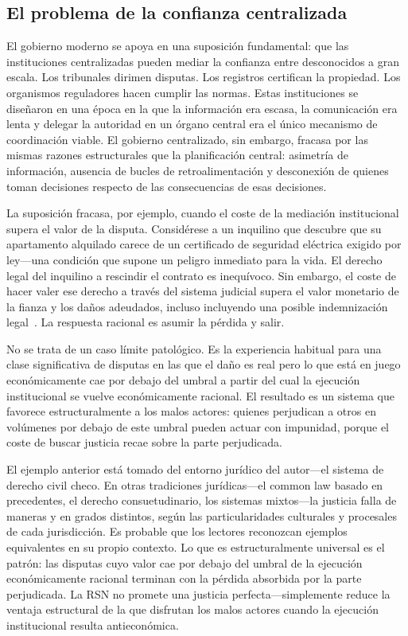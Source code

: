 \documentclass[11pt,a4paper,twocolumn]{article}
\begin{document}
\subsection{El problema de la confianza centralizada}

El gobierno moderno se apoya en una suposición fundamental: que las instituciones centralizadas pueden mediar la confianza entre desconocidos a gran escala. Los tribunales dirimen disputas. Los registros certifican la propiedad. Los organismos reguladores hacen cumplir las normas. Estas instituciones se diseñaron en una época en la que la información era escasa, la comunicación era lenta y delegar la autoridad en un órgano central era el único mecanismo de coordinación viable. El gobierno centralizado, sin embargo, fracasa por las mismas razones estructurales que la planificación central: asimetría de información, ausencia de bucles de retroalimentación y desconexión de quienes toman decisiones respecto de las consecuencias de esas decisiones.

La suposición fracasa, por ejemplo, cuando el coste de la mediación institucional supera el valor de la disputa. Considérese a un inquilino que descubre que su apartamento alquilado carece de un certificado de seguridad eléctrica exigido por ley---una condición que supone un peligro inmediato para la vida. El derecho legal del inquilino a rescindir el contrato es inequívoco. Sin embargo, el coste de hacer valer ese derecho a través del sistema judicial supera el valor monetario de la fianza y los daños adeudados, incluso incluyendo una posible indemnización legal~\cite{czcourtfees}. La respuesta racional es asumir la pérdida y salir.

No se trata de un caso límite patológico. Es la experiencia habitual para una clase significativa de disputas en las que el daño es real pero lo que está en juego económicamente cae por debajo del umbral a partir del cual la ejecución institucional se vuelve económicamente racional. El resultado es un sistema que favorece estructuralmente a los malos actores: quienes perjudican a otros en volúmenes por debajo de este umbral pueden actuar con impunidad, porque el coste de buscar justicia recae sobre la parte perjudicada.

El ejemplo anterior está tomado del entorno jurídico del autor---el sistema de derecho civil checo. En otras tradiciones jurídicas---el common law basado en precedentes, el derecho consuetudinario, los sistemas mixtos---la justicia falla de maneras y en grados distintos, según las particularidades culturales y procesales de cada jurisdicción. Es probable que los lectores reconozcan ejemplos equivalentes en su propio contexto. Lo que es estructuralmente universal es el patrón: las disputas cuyo valor cae por debajo del umbral de la ejecución económicamente racional terminan con la pérdida absorbida por la parte perjudicada. La RSN no promete una justicia perfecta---simplemente reduce la ventaja estructural de la que disfrutan los malos actores cuando la ejecución institucional resulta antieconómica.
\end{document}
